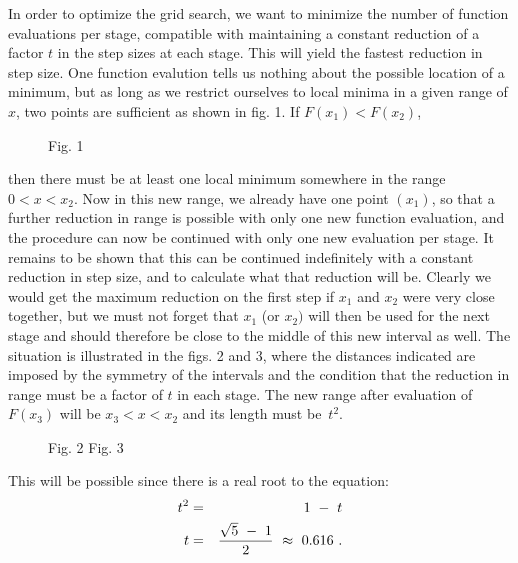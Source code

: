      In order to optimize the grid search, we want to minimize the
number of function evaluations per stage, compatible with maintaining
a constant reduction of a factor $t$ in the step sizes at each stage.
This will yield the fastest reduction in step size.  One function evalution
tells us nothing about the possible location of a minimum, but as
long as we restrict ourselves to local minima in a given range of $x$, two
points are sufficient as shown in fig. 1. If $F(x_1) < F(x_2)$,
\begin{figure}
\begin{center}\mbox{}\end{center}
 
\begin{center}
Fig. 1
\end{center}
 \end{figure}
then there must be at least one local minimum somewhere in the
 range $0 < x < x_2$. Now in this new range, we already have one
 point $(x_1)$, so that a further  reduction in range is possible                                     
 with only one new function evaluation,                                     
  and the procedure can now be continued
with only one new evaluation per stage.
It remains to be shown that this can be continued indefinitely
with a constant reduction in step size, and to calculate what that
reduction will be. Clearly we would get the maximum reduction on the
first step if $x_1$ and $x_2$
were very close together, but we must not forget that
$x_1$ (or $x_2)$ will then be used for the next stage and should therefore be
close to the middle of this new interval as well.  The situation is
illustrated in the figs. 2 and 3, where the distances indicated are
imposed by the symmetry of the intervals and the condition that the
reduction in range must be a factor of $t$ in each stage.  The new range
after evaluation of $F(x_3)$ will be $x_3 < x < x_2$ and
its length must be~$t^{2}$.
 
\begin{figure}
\begin{center}\mbox{}\end{center}
 
\begin{center}
Fig. 2\hskip68mm Fig. 3
\end{center}
 \end{figure}
 
This will be possible since there is a real root to the equation:
\begin{eqnarray}
t^2&=&1~-~t\nonumber\\
t&=&{\sqrt{5}~-~1\over
2}~\approx~0.616~.\nonumber
\end{eqnarray}                                  
 
